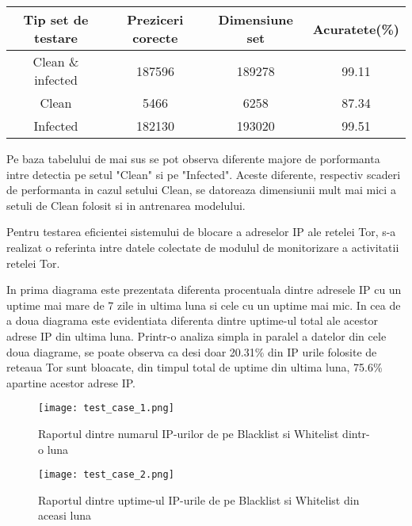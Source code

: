 \begin{center}
	\begin{tabular}{||c c c c||} 
		\hline
		Tip set de testare  & Preziceri corecte & Dimensiune set & Acuratete(\%) \\ [0.5ex] 
		\hline\hline
		Clean \& infected & 187596 & 189278 & 99.11 \\ 
		\hline
		Clean & 5466 & 6258 & 87.34 \\
		\hline
		Infected & 182130 & 193020 & 99.51 \\
		\hline
	\end{tabular}
\end{center}

Pe baza tabelului de mai sus se pot observa diferente majore de porformanta intre detectia pe setul "Clean" si pe "Infected". Aceste diferente, respectiv scaderi de performanta in cazul setului Clean, se datoreaza dimensiunii mult mai mici a setuli de Clean folosit si in antrenarea modelului.

Pentru testarea eficientei sistemului de blocare a adreselor IP ale retelei Tor, s-a realizat o referinta intre datele colectate de modulul de monitorizare a activitatii retelei Tor.

In prima diagrama este prezentata diferenta procentuala dintre adresele IP cu un uptime mai mare de 7 zile in ultima luna si cele cu un uptime mai mic. In cea de a doua diagrama este evidentiata diferenta dintre uptime-ul total ale acestor adrese IP din ultima luna. Printr-o analiza simpla in paralel a datelor din cele doua diagrame, se poate observa ca desi doar 20.31\% din IP urile folosite de reteaua Tor sunt bloacate, din timpul total de uptime din ultima luna, 75.6\% apartine acestor adrese IP.

\begin{figure}
	\centering
	\texttt{[image: test\_case\_1.png]}
	\caption{Raportul dintre numarul IP-urilor de pe Blacklist si Whitelist dintr-o luna}
	\label{fig:test_1}
\end{figure}

\begin{figure}
	\centering
	\texttt{[image: test\_case\_2.png]}
	\caption{Raportul dintre uptime-ul IP-urile de pe Blacklist si Whitelist din aceasi luna}
	\label{fig:test_2}
\end{figure}


\newpage
